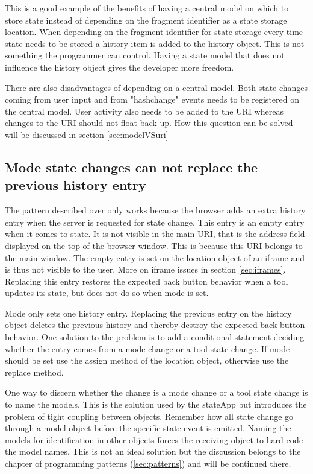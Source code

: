 \documentclass[english]{ifimaster}
\begin{document}
This is a good example of the benefits of having a central model on which to store state instead of depending on the fragment identifier as a state storage location. When depending on the fragment identifier for state storage every time state needs to be stored a history item is added to the history object. This is not something the programmer can control. Having a state model that does not influence the history object gives the developer more freedom. 

There are also disadvantages of depending on a central model. Both state changes coming from user input and from "hashchange" events needs to be registered on the central model. User activity also needs to be added to the URI whereas changes to the URI should not float back up. How this question can be solved will be discussed in section \ref{sec:modelVSuri} 


\subsection{Mode state changes can not replace the previous history entry}
The pattern described over only works because the browser adds an extra history entry when the server is requested for state change. This entry is an empty entry when it comes to state. It is not visible in the main URI, that is the address field displayed on the top of the browser window. This is because this URI belongs to the main window. The empty entry is set on the location object of an iframe and is thus not visible to the user. More on iframe issues in section \ref{sec:iframes}. Replacing this entry restores the expected back button behavior when a tool updates its state, but does not do so when mode is set. 

Mode only sets one history entry. Replacing the previous entry on the history object deletes the previous history and thereby destroy the expected back button behavior. One solution to the problem is to add a conditional statement deciding whether the entry comes from a mode change or a tool state change. If mode should be set use the assign method of the location object, otherwise use the replace method. 

One way to discern whether the change is a mode change or a tool state change is to name the models. This is the solution used by the stateApp but introduces the problem of tight coupling between objects. Remember how all state change go through a model object before the specific state event is emitted. Naming the models for identification in other objects forces the receiving object to hard code the model names. This is not an ideal solution but the discussion belongs to the chapter of programming patterns (\ref{sec:patterns}) and will be continued there. 
\end{document}
